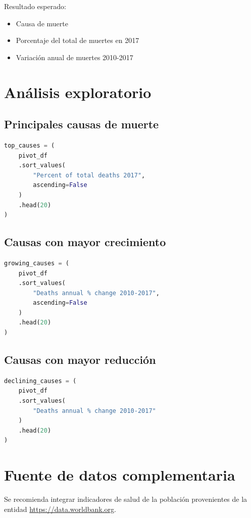 \documentclass[12pt,a4paper]{article}
\begin{document}
Resultado esperado:

\begin{itemize}
\item Causa de muerte
\item Porcentaje del total de muertes en 2017
\item Variación anual de muertes 2010-2017
\end{itemize}

\section{Análisis exploratorio}

\subsection{Principales causas de muerte}

\begin{lstlisting}[language=Python]
top_causes = (
    pivot_df
    .sort_values(
        "Percent of total deaths 2017",
        ascending=False
    )
    .head(20)
)
\end{lstlisting}

\subsection{Causas con mayor crecimiento}

\begin{lstlisting}[language=Python]
growing_causes = (
    pivot_df
    .sort_values(
        "Deaths annual % change 2010-2017",
        ascending=False
    )
    .head(20)
)
\end{lstlisting}

\subsection{Causas con mayor reducción}

\begin{lstlisting}[language=Python]
declining_causes = (
    pivot_df
    .sort_values(
        "Deaths annual % change 2010-2017"
    )
    .head(20)
)
\end{lstlisting}

\section{Fuente de datos complementaria}

Se recomienda integrar indicadores de salud de la población provenientes de la entidad
\url{https://data.worldbank.org}.
\end{document}

